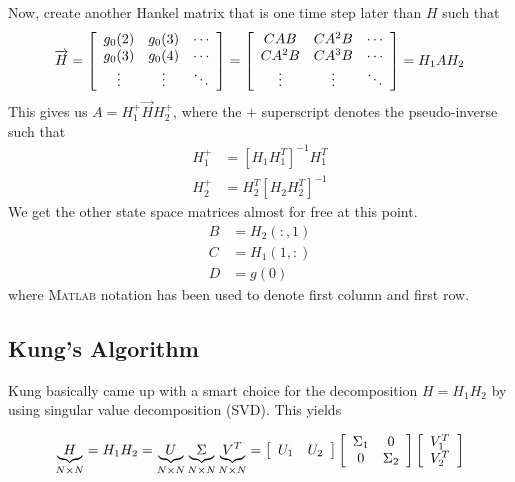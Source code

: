 Now, create another Hankel matrix that is one time step later than $H$ such that
\begin{align*}
\overrightarrow{H} = \left[\begin{array}{c c c} g_0(2) & g_0(3) & \cdots \\ g_0(3) & g_0(4) & \cdots \\ \vdots & \vdots & \ddots \end{array}\right]
= \left[\begin{array}{c c c} CAB & CA^2B & \cdots \\ CA^2B & CA^3B & \cdots \\ \vdots & \vdots & \ddots \end{array}\right] = H_1AH_2
\end{align*}
This gives us $A=H_1^+\overrightarrow{H}H_2^+$, where the $+$ superscript denotes the pseudo-inverse such that
\begin{align*}
H_1^+ &= {[H_1H_1^T]}^{-1}H_1^T \\
H_2^+ &= {H_2^T[H_2H_2^T]}^{-1}
\end{align*}
We get the other state space matrices almost for free at this point.
\begin{align*}
B &= H_2(:,1) \\
C &= H_1(1,:) \\
D &= g(0)
\end{align*}
where \textsc{Matlab} notation has been used to denote first column and first row.

\subsection{Kung's Algorithm}
Kung basically came up with a smart choice for the decomposition $H=H_1 H_2$ by using singular value decomposition (SVD).
This yields

\begin{equation*}
\underbrace{H}_{N\times N} = H_1H_2 = \underbrace{U}_{N\times N} \underbrace{\Sigma}_{N\times N} \underbrace{V^T}_{N\times N} = \left[\begin{array}{c c} U_1 & U_2 \end{array}\right] \left[\begin{array}{c c} \Sigma_1 & 0 \\ 0 & \Sigma_2 \end{array}\right] \left[\begin{array}{c} V_1^T \\ V_2^T \end{array}\right]
\end{equation*}

